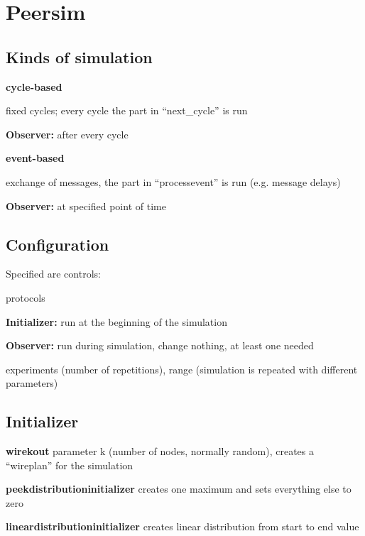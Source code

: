 \chapter{Peersim}
\section{Kinds of simulation}
\textbf{cycle-based}\\
\begin{compactitem}
    \item fixed cycles; every cycle the part in ``next\_cycle'' is run
    \item \textbf{Observer:} after every cycle
\end{compactitem}

\textbf{event-based}\\
\begin{compactitem}
    \item exchange of messages, the part in ``processevent'' is run (e.g. message delays)
    \item \textbf{Observer:} at specified point of time
\end{compactitem}

\section{Configuration}
Specified are controls:\\
\begin{compactitem}
    \item protocols
    \item \textbf{Initializer:} run at the beginning of the simulation
    \item \textbf{Observer:} run during simulation, change nothing, at least one needed
\end{compactitem}

experiments (number of repetitions), range (simulation is repeated with different parameters)
\section{Initializer}
\begin{compactitem}
    \item \textbf{wirekout} parameter k (number of nodes, normally random), creates a ``wireplan'' for the simulation
    \item \textbf{peekdistributioninitializer} creates one maximum and sets everything else to zero
    \item \textbf{lineardistributioninitializer} creates linear distribution from start to end value
\end{compactitem}

